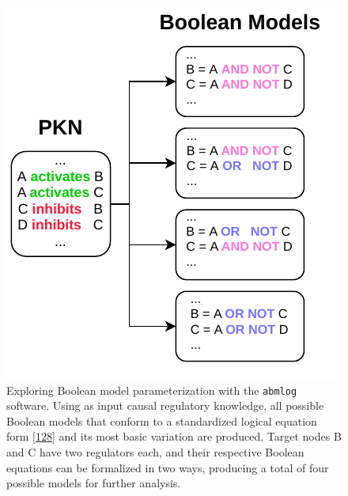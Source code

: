 \documentclass[
  12pt,
]{book}
\begin{document}
\begin{figure}
\centering
\includegraphics{img/abmlog_simple.pdf}
\caption{\label{fig:fig7}Exploring Boolean model parameterization with the \texttt{abmlog} software. Using as input causal regulatory knowledge, all possible Boolean models that conform to a standardized logical equation form {[}\protect\hyperlink{ref-Mendoza2006}{128}{]} and its most basic variation are produced. Target nodes B and C have two regulators each, and their respective Boolean equations can be formalized in two ways, producing a total of four possible models for further analysis.}
\end{figure}

\newpage
\end{document}
